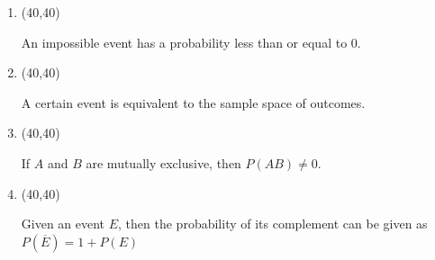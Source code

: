 \documentclass[11pt,twoside]{article}
\numberwithin{equation}{section}
\newcommand{\?}{\stackrel{?}{=}}
\newcommand{\ol}{\overline}
\newcommand{\gr}{\color{green!40!black}}
\begin{document}
\begin{enumerate}[\bf (i)]
\item \hfill
  \begin{minipage}{.1\linewidth}
    \framebox(40,40){ \gr }
  \end{minipage}\quad
  \begin{minipage}{.85\linewidth}
    An impossible event has a probability less than or equal to 0. %
  \end{minipage}

    \smallskip


  
\item \hfill
  \begin{minipage}{.1\linewidth}
    \framebox(40,40){\gr  }
  \end{minipage}\quad
  \begin{minipage}{.85\linewidth}
    A certain event is equivalent to the sample space of outcomes.
  \end{minipage}

  \smallskip
  
\item \hfill
  \begin{minipage}{.1\linewidth}
    \framebox(40,40){\gr  }
  \end{minipage}\quad
  \begin{minipage}{.85\linewidth}
    If $A$ and $B$ are mutually exclusive, then $P(AB) \ne 0$.
  \end{minipage}

  \smallskip
  
\item \hfill
  \begin{minipage}{.1\linewidth}
    \framebox(40,40){\gr  }
  \end{minipage}\quad
  \begin{minipage}{.85\linewidth}
    Given an event $E$, then the probability of its complement can be given as $P(\ol{E}) = 1 + P(E)$
  \end{minipage}


\end{enumerate}
\end{document}
